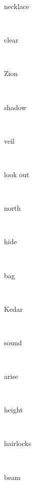 \documentclass[a4paper]{article}
\begin{document}
\begin{multicols}{4}
\begin{multicols}{4}
\begin{multicols}{5}
{\hebrewfont{}} \begin{english}necklace\end{english}\\
{\hebrewfont{}} \begin{english}clear\end{english}\\
{\hebrewfont{}} \begin{english}Zion\end{english}\\
{\hebrewfont{}} \begin{english}shadow\end{english}\\
{\hebrewfont{}} \begin{english}veil\end{english}\\
{\hebrewfont{}} \begin{english}look out\end{english}\\
{\hebrewfont{}} \begin{english}north\end{english}\\
{\hebrewfont{}} \begin{english}hide\end{english}\\
{\hebrewfont{}} \begin{english}bag\end{english}\\
{\hebrewfont{}} \begin{english}Kedar\end{english}\\
{\hebrewfont{}} \begin{english}sound\end{english}\\
{\hebrewfont{}} \begin{english}arise\end{english}\\
{\hebrewfont{}} \begin{english}height\end{english}\\
{\hebrewfont{}} \begin{english}hairlocks\end{english}\\
{\hebrewfont{}} \begin{english}beam\end{english}\\

\end{multicols}
\end{multicols}
\end{multicols}
\end{document}
